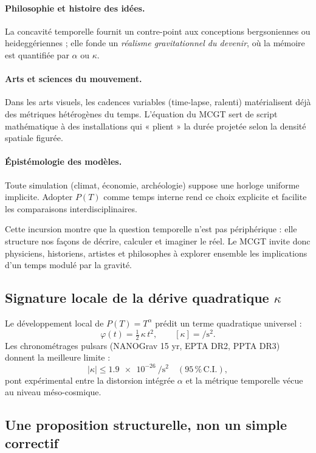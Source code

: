 \documentclass[11pt]{article}
\begin{document}
\paragraph{Philosophie et histoire des idées.}
La concavité temporelle fournit un contre-point aux conceptions
bergsoniennes ou heideggériennes ; elle fonde un
\emph{réalisme gravitationnel du devenir}, où la mémoire est
quantifiée par \(\alpha\) ou \(\kappa\).

\paragraph{Arts et sciences du mouvement.}
Dans les arts visuels, les cadences variables (time-lapse,
ralenti) matérialisent déjà des métriques hétérogènes du temps.  
L’équation du MCGT sert de script mathématique à des installations
qui « plient » la durée projetée selon la densité spatiale figurée.

\paragraph{Épistémologie des modèles.}
Toute simulation (climat, économie, archéologie) suppose une horloge
uniforme implicite.  Adopter \(P(T)\) comme temps interne rend ce
choix explicite et facilite les comparaisons interdisciplinaires.

Cette incursion montre que la question temporelle n’est pas périphérique :
elle structure nos façons de décrire, calculer et imaginer le réel.
Le MCGT invite donc physiciens, historiens, artistes et philosophes à
explorer ensemble les implications d’un temps modulé par la gravité.

\subsection{Signature locale de la dérive quadratique
            \texorpdfstring{$\kappa$}{kappa}}
\label{sec:kappa-local}

Le développement local de \(P(T)=T^{\alpha}\) prédit un terme quadratique
universel :
\[
\varphi(t)=\tfrac12\,\kappa\,t^{2},
\qquad
[\kappa]=\si{\per\square\second}.
\]
Les chronométrages pulsars (NANOGrav 15 yr, EPTA DR2, PPTA DR3)
donnent la meilleure limite :
\[
\lvert\kappa\rvert\le
\SI{1.9e-26}{\per\square\second}\quad(95\,\%\,\text{C.I.}),
\]
pont expérimental entre la distorsion intégrée \(\alpha\) et la
métrique temporelle vécue au niveau méso-cosmique.

\subsection{Une proposition structurelle, non un simple correctif}
\end{document}
